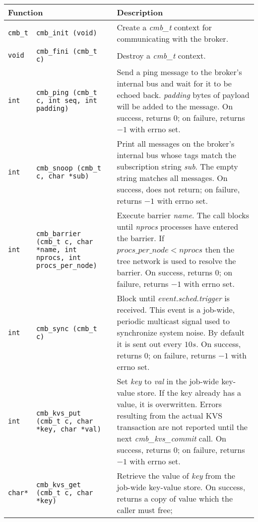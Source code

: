 \begin{table}
\centering
\begin{tabular}{|p{0.7cm}p{5cm}|p{9cm}|}\hline
\multicolumn{2}{|l|}{\textbf{Function}}
  & \textbf{Description} \\
\hline
{\tt cmb\_t} & {\tt cmb\_init (void)}
  & Create a {\em cmb\_t} context for communicating with the broker.\\
{\tt void} & {\tt cmb\_fini (cmb\_t c)}
  & Destroy a {\em cmb\_t} context.\\
\hline
{\tt int} & {\tt cmb\_ping (cmb\_t c, int seq, int padding)}
  & Send a ping message to the broker's internal bus and wait for it
    to be echoed back.  {\em padding} bytes of payload will be added to
    the message.
    On success, returns $0$; on failure, returns $-1$ with errno set.\\
\hline
{\tt int} & {\tt cmb\_snoop (cmb\_t c, char {*sub})}
  & Print all messages on the broker's internal bus whose tags match the
    subscription string {\em sub}.  The empty string matches all messages.
    On success, does not return; on failure, returns $-1$ with errno set.\\
\hline
{\tt int}
  & {\tt cmb\_barrier (cmb\_t c, char {*name}, int nprocs,
                       int procs\_per\_node)}
  & Execute barrier {\em name}.  The call blocks until {\em nprocs}
    processes have entered the barrier.  If $procs\_per\_node < nprocs$
    then the tree network is used to resolve the barrier.
    On success, returns $0$; on failure, returns $-1$ with errno set.\\
\hline
{\tt int}
  & {\tt cmb\_sync (cmb\_t c)}
  & Block until {\em event.sched.trigger} is received.  This event is
    a job-wide, periodic multicast signal used to synchronize system noise.
    By default it is sent out every $10s$.
    On success, returns $0$; on failure, returns $-1$ with errno set.\\
\hline
{\tt int}
  & {\tt cmb\_kvs\_put (cmb\_t c, char {*key}, char {*val})}
  & Set {\em key} to {\em val} in the job-wide key-value store.
    If the key already has a value, it is overwritten.
    Errors resulting from the actual KVS transaction are not reported
    until the next {\em cmb\_kvs\_commit} call.
    On success, returns $0$; on failure, returns $-1$ with errno set.\\
{\tt {char*}}
  & {\tt cmb\_kvs\_get (cmb\_t c, char {*key})}
  & Retrieve the value of {\em key} from the job-wide key-value store.
    On success, returns a copy of value which the caller must free;

\end{tabular}
\end{table}
